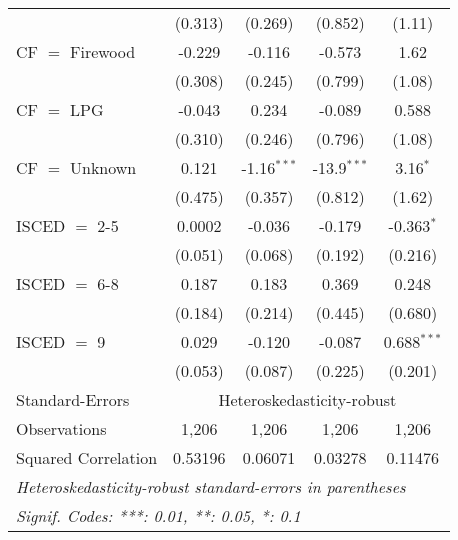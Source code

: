 \begin{table}[htbp!]
\begin{adjustbox}{width = 1\textwidth, max height = 0.95\textheight, center}
\begin{threeparttable}[b]
\begin{tabular}{lcccc}
                                 & (0.313)            & (0.269)            & (0.852)        & (1.11)\\   
            CF $=$ Firewood      & -0.229             & -0.116             & -0.573         & 1.62\\   
                                 & (0.308)            & (0.245)            & (0.799)        & (1.08)\\   
            CF $=$ LPG           & -0.043             & 0.234              & -0.089         & 0.588\\   
                                 & (0.310)            & (0.246)            & (0.796)        & (1.08)\\   
            CF $=$ Unknown       & 0.121              & -1.16$^{***}$      & -13.9$^{***}$  & 3.16$^{*}$\\   
                                 & (0.475)            & (0.357)            & (0.812)        & (1.62)\\   
            ISCED $=$ 2-5        & 0.0002             & -0.036             & -0.179         & -0.363$^{*}$\\   
                                 & (0.051)            & (0.068)            & (0.192)        & (0.216)\\   
            ISCED $=$ 6-8        & 0.187              & 0.183              & 0.369          & 0.248\\   
                                 & (0.184)            & (0.214)            & (0.445)        & (0.680)\\   
            ISCED $=$ 9          & 0.029              & -0.120             & -0.087         & 0.688$^{***}$\\   
                                 & (0.053)            & (0.087)            & (0.225)        & (0.201)\\   
            \midrule 
            Standard-Errors & \multicolumn{4}{c}{Heteroskedasticity-robust} \\ 
            Observations         & 1,206              & 1,206              & 1,206          & 1,206\\  
            Squared Correlation  & 0.53196            & 0.06071            & 0.03278        & 0.11476\\  
            \midrule \midrule
            \multicolumn{5}{l}{\emph{Heteroskedasticity-robust standard-errors in parentheses}}\\
            \multicolumn{5}{l}{\emph{Signif. Codes: ***: 0.01, **: 0.05, *: 0.1}}\\
         \end{tabular}
         

\end{threeparttable}
\end{adjustbox}
\end{table}
